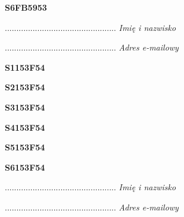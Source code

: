 \begin{turn}{90}\huge \textbf{S6FB5953}\end{turn}

\begin{turn}{90}\begin{minipage}{\linewidth} \vspace{20mm} ................................................  \textit{Imię i nazwisko}\end{minipage}\end{turn}

\begin{turn}{90}\begin{minipage}{\linewidth} \vspace{20mm} ................................................  \textit{Adres e-mailowy}\end{minipage}\end{turn}

\begin{turn}{90}\huge \textbf{S1153F54}\end{turn}

\begin{turn}{90}\huge \textbf{S2153F54}\end{turn}

\begin{turn}{90}\huge \textbf{S3153F54}\end{turn}

\begin{turn}{90}\huge \textbf{S4153F54}\end{turn}

\begin{turn}{90}\huge \textbf{S5153F54}\end{turn}

\begin{turn}{90}\huge \textbf{S6153F54}\end{turn}

\begin{turn}{90}\begin{minipage}{\linewidth} \vspace{20mm} ................................................  \textit{Imię i nazwisko}\end{minipage}\end{turn}

\begin{turn}{90}\begin{minipage}{\linewidth} \vspace{20mm} ................................................  \textit{Adres e-mailowy}\end{minipage}\end{turn}

